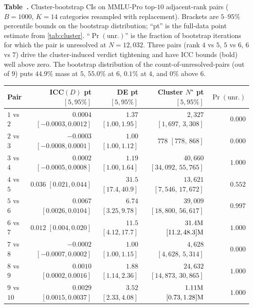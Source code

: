 \documentclass{article}
\theoremstyle{plain}
\theoremstyle{definition}
\begin{document}
\label{tab:icc_bootstrap}%
\begin{center}\scriptsize\vspace{-1ex}
\textbf{Table~\thetable.} Cluster-bootstrap CIs on MMLU-Pro top-$10$ adjacent-rank pairs ($B{=}1000$, $K{=}14$ categories resampled with replacement). Brackets are $5$--$95\%$ percentile bounds on the bootstrap distribution; ``pt'' is the full-data point estimate from \cref{tab:cluster}. ``$\Pr(\text{unr.})$'' is the fraction of bootstrap iterations for which the pair is unresolved at $N{=}12{,}032$. Three pairs (rank $4$ vs $5$, $5$ vs $6$, $6$ vs $7$) drive the cluster-induced verdict tightening and have ICC bounds (bold) well above zero. The bootstrap distribution of the count-of-unresolved-pairs (out of $9$) puts $44.9\%$ mass at $5$, $55.0\%$ at $6$, $0.1\%$ at $4$, and $0\%$ above $6$.\\[3pt]
\setlength{\tabcolsep}{2pt}
\begin{tabular}{lrrrr}
\toprule
Pair & ICC$(D)$ pt $[5,95\%]$ & DE pt $[5,95\%]$ & Cluster $N^{\star}$ pt $[5,95\%]$ & $\Pr(\text{unr.})$ \\
\midrule
$1$ vs $2$  & $0.0004$ $[-0.0003, 0.0012]$ & $1.37$ $[1.00, 1.95]$  & $2{,}327$ $[1{,}697,\,3{,}308]$ & $0.000$ \\
$2$ vs $3$  & $-0.0003$ $[-0.0008, 0.0001]$ & $1.00$ $[1.00, 1.12]$ & $778$ $[778,\,868]$ & $0.000$ \\
$3$ vs $4$  & $0.0002$ $[-0.0005, 0.0008]$ & $1.19$ $[1.00, 1.64]$ & $40{,}660$ $[34{,}092,\,55{,}765]$ & $1.000$ \\
$4$ vs $5$  & $\mathbf{0.036}$ $\mathbf{[0.021, 0.044]}$ & $31.5$ $[17.4, 40.9]$ & $13{,}621$ $[7{,}546,\,17{,}672]$ & $0.552$ \\
$5$ vs $6$  & $\mathbf{0.0067}$ $\mathbf{[0.0026, 0.0104]}$ & $6.74$ $[3.25, 9.78]$ & $39{,}009$ $[18{,}800,\,56{,}617]$ & $0.997$ \\
$6$ vs $7$  & $\mathbf{0.012}$ $\mathbf{[0.004, 0.020]}$ & $11.5$ $[4.12, 17.7]$ & $31.4{\rm M}$ $[11.2, 48.3]{\rm M}$ & $1.000$ \\
$7$ vs $8$  & $-0.0002$ $[-0.0007, 0.0002]$ & $1.00$ $[1.00, 1.15]$ & $4{,}628$ $[4{,}628,\,5{,}314]$ & $0.000$ \\
$8$ vs $9$  & $0.0010$ $[0.0002, 0.0016]$ & $1.88$ $[1.14, 2.36]$ & $24{,}632$ $[14{,}873,\,30{,}865]$ & $1.000$ \\
$9$ vs $10$ & $0.0029$ $[0.0015, 0.0037]$ & $3.52$ $[2.33, 4.08]$ & $1.11{\rm M}$ $[0.73, 1.28]{\rm M}$ & $1.000$ \\
\bottomrule
\end{tabular}
\end{center}
\end{document}

